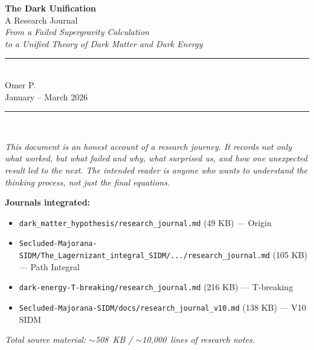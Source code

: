 \documentclass[12pt, a4paper]{article}
\begin{document}
\onehalfspacing

\thispagestyle{empty}
\begin{center}

{\fontsize{28}{34}\selectfont\bfseries\color{journalblue}
The Dark Unification}\\[0.4em]

{\fontsize{16}{20}\selectfont\color{journalgray}
A Research Journal}\\[2em]

{\large\itshape
From a Failed Supergravity Calculation\\
to a Unified Theory of Dark Matter and Dark Energy}\\[3em]

\rule{0.6\linewidth}{1pt}\\[1.5em]

{\large Omer P.}\\[0.3em]
{\normalsize January -- March 2026}\\[3em]

\rule{0.6\linewidth}{0.4pt}\\[1.5em]

\begin{minipage}{0.78\textwidth}
\small\color{journalgray}
\textit{
This document is an honest account of a research journey.
It records not only what worked, but what failed and why,
what surprised us, and how one unexpected result led to the next.
The intended reader is anyone who wants to understand the thinking
process, not just the final equations.}
\end{minipage}

\vfill

{\small
\textbf{Journals integrated:}
\begin{itemize}[noitemsep, leftmargin=3cm]
  \item[\textbullet] \texttt{dark\_matter\_hypothesis/research\_journal.md} (49 KB) --- Origin
  \item[\textbullet] \texttt{Secluded-Majorana-SIDM/The\_Lagernizant\_integral\_SIDM/.../research\_journal.md} (105 KB) --- Path Integral
  \item[\textbullet] \texttt{dark-energy-T-breaking/research\_journal.md} (216 KB) --- T-breaking
  \item[\textbullet] \texttt{Secluded-Majorana-SIDM/docs/research\_journal\_v10.md} (138 KB) --- V10 SIDM
\end{itemize}
\emph{Total source material: $\sim$508~KB / $\sim$10{,}000~lines of research notes.}}

\end{center}
\end{document}
